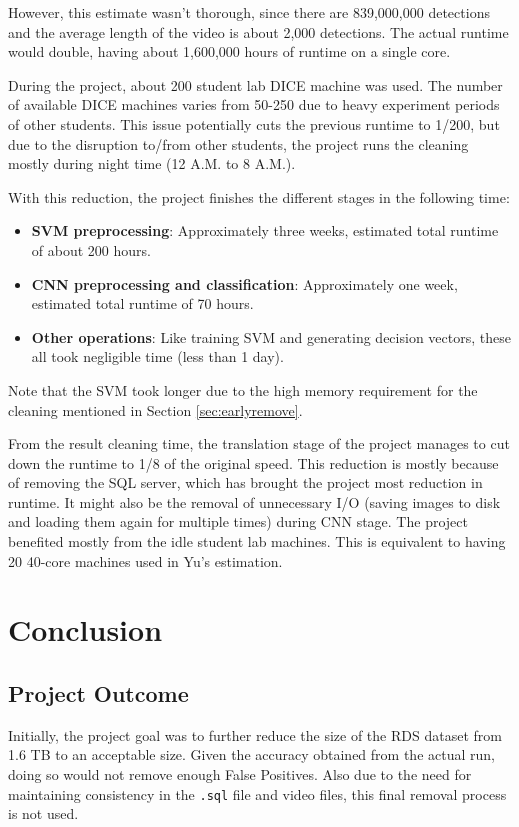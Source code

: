 \documentclass[bsc,frontabs,twoside,fullspacing,parskip,deptreport]{infthesis}
\begin{document}
However, this estimate wasn't thorough, since there are 839,000,000 detections and the average length of the video is about 2,000 detections.
The actual runtime would double, having about 1,600,000 hours of runtime on a single core. 

During the project, about 200 student lab DICE machine was used. 
The number of available DICE machines varies from 50-250 due to heavy experiment periods of other students.
This issue potentially cuts the previous runtime to 1/200, but due to the disruption to/from other students, the project runs the cleaning mostly during night time (12 A.M. to 8 A.M.).

With this reduction, the project finishes the different stages in the following time:
\begin{itemize}
\setlength{\parskip}{-1pt}
\item \textbf{SVM preprocessing}: Approximately three weeks, estimated total runtime of about 200 hours. 
\item \textbf{CNN preprocessing and classification}: Approximately one week, estimated total runtime of 70 hours. 
\item \textbf{Other operations}: Like training SVM and generating decision vectors, these all took negligible time (less than 1 day). 
\end{itemize}
Note that the SVM took longer due to the high memory requirement for the cleaning mentioned in Section \ref{sec:earlyremove}.

From the result cleaning time, the translation stage of the project manages to cut down the runtime to 1/8 of the original speed.
This reduction is mostly because of removing the SQL server, which has brought the project most reduction in runtime. 
It might also be the removal of unnecessary I/O (saving images to disk and loading them again for multiple times) during CNN stage. 
The project benefited mostly from the idle student lab machines. This is equivalent to having 20 40-core machines used in Yu's estimation.
\newpage

\chapter{Conclusion}
\label{chap:conclusion}

\section{Project Outcome}

Initially, the project goal was to further reduce the size of the RDS dataset from 1.6 TB to an acceptable size. 
Given the accuracy obtained from the actual run, doing so would not remove enough False Positives. Also due to the need for maintaining consistency in the {\tt .sql} file and video files, this final removal process is not used.
\end{document}
